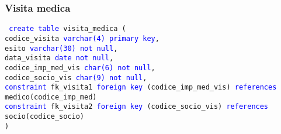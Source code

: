 \documentclass{article}
\begin{document}
    \subsubsection{Visita medica}
    \begin{flushleft}
        \texttt{
        \textcolor{blue}{create table} visita\_medica ( \\
        \hspace*{2em} codice\_visita \hspace*{3.5em} \textcolor{blue}{varchar(4)} \hspace*{2.4em} \textcolor{blue}{primary key}, \\
        \hspace*{2em} esito \hspace*{7.2em} \textcolor{blue}{varchar(30)} \hspace*{2em} \textcolor{blue}{not null}, \\
        \hspace*{2em} data\_visita \hspace*{4.4em} \textcolor{blue}{date} \hspace*{5.4em} \textcolor{blue}{not null}, \\
        \hspace*{2em} codice\_imp\_med\_vis \hspace*{1em} \textcolor{blue}{char(6)} \hspace*{4em} \textcolor{blue}{not null}, \\
        \hspace*{2em} codice\_socio\_vis \hspace*{1.7em} \textcolor{blue}{char(9)} \hspace*{4.2em} \textcolor{blue}{not null}, \\
        \hspace*{2em} \textcolor{blue}{constraint} fk\_visita1 \textcolor{blue}{foreign key} (codice\_imp\_med\_vis) \textcolor{blue}{references} \hspace*{2em} medico(codice\_imp\_med) \\
        \hspace*{2em} \textcolor{blue}{constraint} fk\_visita2 \textcolor{blue}{foreign key} (codice\_socio\_vis) \textcolor{blue}{references} \hspace*{2em} socio(codice\_socio) \\)}
    \end{flushleft}
\end{document}
